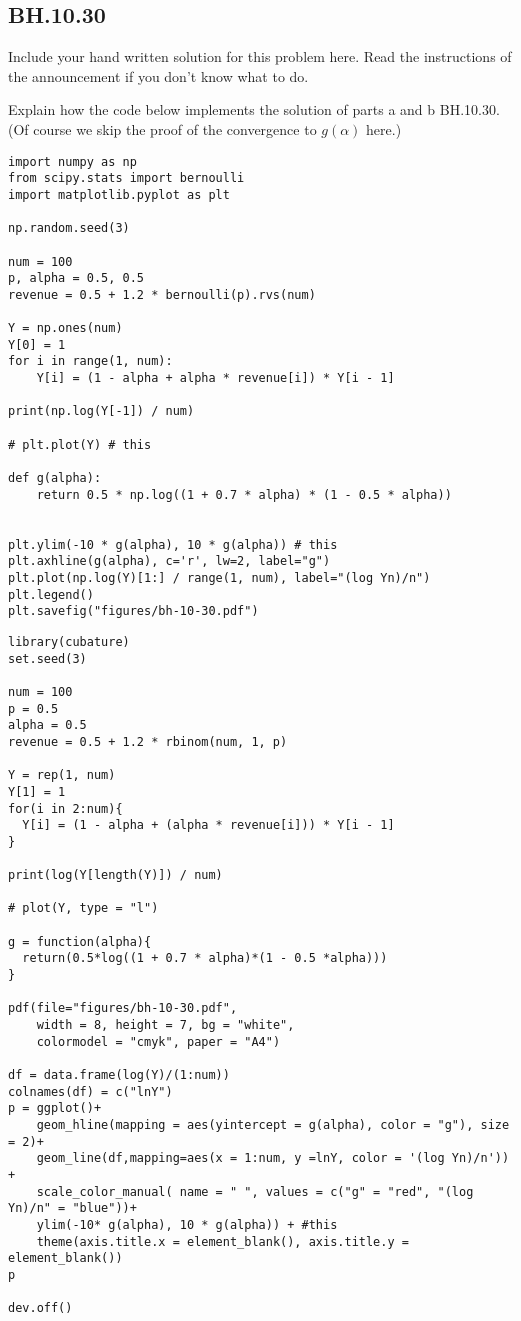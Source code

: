 

\subsection{BH.10.30}

\begin{exercise}
Include your hand written solution for this problem here. Read the instructions of the announcement if you don't know what to do.
\end{exercise}

\begin{exercise}
Explain how the code below implements the solution of parts a and b BH.10.30. (Of course we skip the proof of the convergence to $g(\alpha)$ here.)
\end{exercise}

\begin{verbatim}
import numpy as np
from scipy.stats import bernoulli
import matplotlib.pyplot as plt

np.random.seed(3)

num = 100
p, alpha = 0.5, 0.5
revenue = 0.5 + 1.2 * bernoulli(p).rvs(num)

Y = np.ones(num)
Y[0] = 1
for i in range(1, num):
    Y[i] = (1 - alpha + alpha * revenue[i]) * Y[i - 1]

print(np.log(Y[-1]) / num)

# plt.plot(Y) # this

def g(alpha):
    return 0.5 * np.log((1 + 0.7 * alpha) * (1 - 0.5 * alpha))


plt.ylim(-10 * g(alpha), 10 * g(alpha)) # this
plt.axhline(g(alpha), c='r', lw=2, label="g")
plt.plot(np.log(Y)[1:] / range(1, num), label="(log Yn)/n")
plt.legend()
plt.savefig("figures/bh-10-30.pdf")
\end{verbatim}

\begin{verbatim}
library(cubature)
set.seed(3)

num = 100
p = 0.5
alpha = 0.5
revenue = 0.5 + 1.2 * rbinom(num, 1, p)

Y = rep(1, num)
Y[1] = 1
for(i in 2:num){
  Y[i] = (1 - alpha + (alpha * revenue[i])) * Y[i - 1]
}

print(log(Y[length(Y)]) / num)

# plot(Y, type = "l")

g = function(alpha){
  return(0.5*log((1 + 0.7 * alpha)*(1 - 0.5 *alpha)))
}

pdf(file="figures/bh-10-30.pdf",
    width = 8, height = 7, bg = "white",
    colormodel = "cmyk", paper = "A4")

df = data.frame(log(Y)/(1:num))
colnames(df) = c("lnY")
p = ggplot()+
    geom_hline(mapping = aes(yintercept = g(alpha), color = "g"), size = 2)+
    geom_line(df,mapping=aes(x = 1:num, y =lnY, color = '(log Yn)/n')) +
    scale_color_manual( name = " ", values = c("g" = "red", "(log Yn)/n" = "blue"))+
    ylim(-10* g(alpha), 10 * g(alpha)) + #this
    theme(axis.title.x = element_blank(), axis.title.y = element_blank())
p

dev.off()
\end{verbatim}


